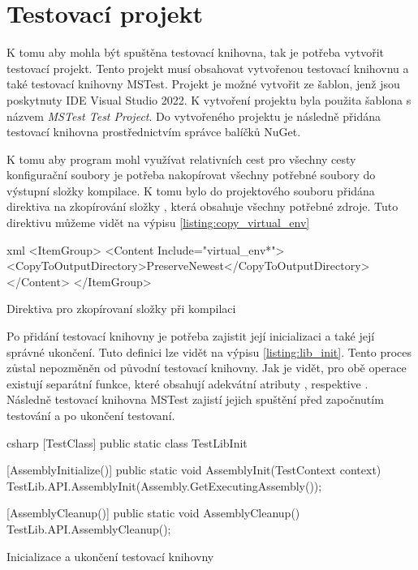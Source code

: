 \section{Testovací projekt}

K tomu aby mohla být spuštěna testovací knihovna, tak je potřeba vytvořit testovací projekt. Tento projekt musí obsahovat vytvořenou testovací knihovnu a také testovací knihovny MSTest. Projekt je možné vytvořit ze šablon, jenž jsou poskytnuty IDE Visual Studio 2022\cite{vs2022}. K vytvoření projektu byla použita šablona s názvem \textit{MSTest Test Project}. Do vytvořeného projektu je následně přidána testovací knihovna prostřednictvím správce balíčků NuGet\cite{nuget}. 

K tomu aby program mohl využívat relativních cest pro všechny cesty konfigurační soubory je potřeba nakopírovat všechny potřebné soubory do výstupní složky kompilace. K tomu bylo do projektového souboru přidána direktiva na zkopírování složky , která obsahuje všechny potřebné zdroje. Tuto direktivu můžeme vidět na výpisu \ref{listing:copy_virtual_env}

\begin{listing}[htbp]
    \centering
    \begin{cminted}[breaklines,autogobble, fontsize=\footnotesize]{xml}
<ItemGroup>
    <Content Include="virtual_env\**">
        <CopyToOutputDirectory>PreserveNewest</CopyToOutputDirectory>
    </Content>
</ItemGroup>
    \end{cminted}
\caption{Direktiva pro zkopírovaní složky při kompilaci}
\label{listing:copy_virtual_env}
\end{listing}


Po přidání testovací knihovny je potřeba zajistit její inicializaci a také její správné ukončení. Tuto definici lze vidět na výpisu \ref{listing:lib_init}. Tento proces zůstal nepozměněn od původní testovací knihovny. Jak je vidět, pro obě operace existují separátní funkce, které obsahují adekvátní atributy , respektive . Následně testovací knihovna MSTest zajistí jejich spuštění před započnutím testování a po ukončení testovaní.  

\begin{listing}[htbp]
    \centering
    \begin{cminted}[breaklines,autogobble, fontsize=\small]{csharp}
        [TestClass]
        public static class TestLibInit
        {
            [AssemblyInitialize()]
            public static void AssemblyInit(TestContext context)
            {
                TestLib.API.AssemblyInit(Assembly.GetExecutingAssembly());
            }
    
            [AssemblyCleanup()]
            public static void AssemblyCleanup()
            {
                TestLib.API.AssemblyCleanup();
            }
    
        }
    \end{cminted}
\caption{Inicializace a ukončení testovací knihovny}
\label{listing:lib_init}
\end{listing}

